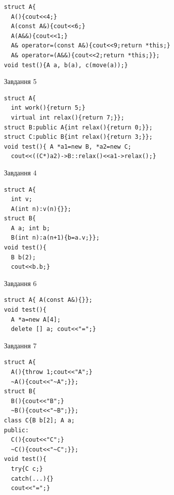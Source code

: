 \documentclass[12pt, ukrainian]{article}
\begin{document}
{{{{{{{{{{{{\begin{minipage}[t]{11cm}
\begin{verbatim}
struct A{
  A(){cout<<4;}
  A(const A&){cout<<6;}
  A(A&&){cout<<1;}
  A& operator=(const A&){cout<<9;return *this;}
  A& operator=(A&&){cout<<2;return *this;}};
void test(){A a, b(a), c(move(a));}
\end{verbatim}            


               
{\begin{center}Завдання {5}\end{center}}
\vspace{-6mm}

\begin{verbatim}
struct A{
  int work(){return 5;}
  virtual int relax(){return 7;}};
struct B:public A{int relax(){return 0;}};
struct C:public B{int relax(){return 3;}};
void test(){ A *a1=new B, *a2=new C;
  cout<<((C*)a2)->B::relax()<<a1->relax();}
\end{verbatim}            


\end{minipage}
\vline \hspace{8mm}
\begin{minipage}[t]{7cm}
               
{\begin{center}Завдання {4}\end{center}}
\vspace{-6mm}

\begin{verbatim}
struct A{
  int v;
  A(int n):v(n){}};
struct B{
  A a; int b;
  B(int n):a(n+1){b=a.v;}};
void test(){
  B b(2);
  cout<<b.b;}
\end{verbatim}            


               
{\begin{center}Завдання {6}\end{center}}
\vspace{-6mm}

\begin{verbatim}
struct A{ A(const A&){}};
void test(){
  A *a=new A[4]; 
  delete [] a; cout<<"=";} 
\end{verbatim}            


               
{\begin{center}Завдання {7}\end{center}}
\vspace{-6mm}

\begin{verbatim}
struct A{
  A(){throw 1;cout<<"A";}
  ~A(){cout<<"~A";}};
struct B{
  B(){cout<<"B";}
  ~B(){cout<<"~B";}};
class C{B b[2]; A a;
public:
  C(){cout<<"C";}
  ~C(){cout<<"~C";}};
void test(){
  try{C c;} 
  catch(...){} 
  cout<<"=";}
\end{verbatim}            



\end{minipage}}}}}}}}}}}}}
\end{document}
